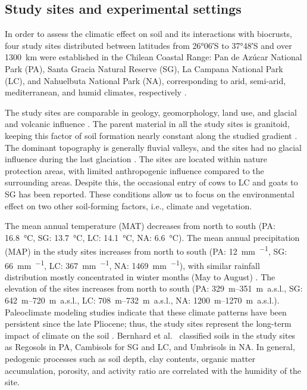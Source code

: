 \subsection{Study sites and experimental settings}

In order to assess the climatic effect on soil and its interactions with biocrusts, four study sites distributed between latitudes from \ang{26;06}S to \ang{37;48}S and over \SI{1300}{\kilo\meter} were established in the Chilean Coastal Range: Pan de Azúcar National Park (PA), Santa Gracia Natural Reserve (SG), La Campana National Park (LC), and Nahuelbuta National Park (NA), corresponding to arid, semi-arid, mediterranean, and humid climates, respectively \cite{Bernhard2018}.

The study sites are comparable in geology, geomorphology, land use, and glacial and volcanic influence \cite{Bernhard2018}. The parent material in all the study sites is granitoid, keeping this factor of soil formation nearly constant along the studied gradient \cite{oeser2018}. The dominant topography is generally fluvial valleys, and the sites had no glacial influence during the last glaciation \cite{Hulton2002}. The sites are located within nature protection areas, with limited anthropogenic influence compared to the surrounding areas. Despite this, the occasional entry of cows to LC \cite{Rundel1975} and goats to SG \cite{Armesto2007} has been reported. These conditions allow us to focus on the environmental effect on two other soil-forming factors, i.e., climate and vegetation.

The mean annual temperature (MAT) decreases from north to south (PA: \SI{16.8}{\degreeCelsius}, SG: \SI{13.7}{\degreeCelsius}, LC: \SI{14.1}{\degreeCelsius}, NA: \SI{6.6}{\degreeCelsius}). The mean annual precipitation (MAP) in the study sites increases from north to south (PA: \SI{12}{\milli\meter\per\year}, SG: \SI{66}{\milli\meter\per\year}, LC: \SI{367}{\milli\meter\per\year}, NA: \SI{1469}{\milli\meter\per\year}), with similar rainfall distribution mostly concentrated in winter months (May to August) \cite{Bernhard2018}. The elevation of the sites increases from north to south (PA: \SIrange{329}{351}{\meter}~a.s.l., SG: \SIrange{642}{720}{\meter}~a.s.l., LC: \SIrange{708}{732}{\meter}~a.s.l., NA: \SIrange{1200}{1270}{\meter}~a.s.l.). Paleoclimate modeling studies \cite{mutz2018} indicate that these climate patterns have been persistent since the late Pliocene; thus, the study sites represent the long-term impact of climate on the soil \cite{ewing2006}. Bernhard et al.~\cite{Bernhard2018} classified soils in the study sites as Regosols in PA, Cambisols for SG and LC, and Umbrisols in NA. In general, pedogenic processes such as soil depth, clay contents, organic matter accumulation, porosity, and activity ratio are correlated with the humidity of the site.

